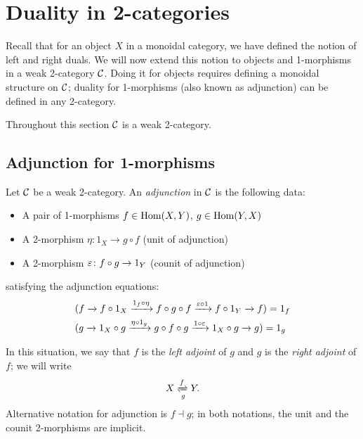 \chapter{Duality in 2-categories}\label{c:duality-2cat}

Recall that for an object $X$ in a monoidal category, we have defined the
notion of left and right duals. We will now extend this notion to objects and
1-morphisms in a weak 2-category $\mathcal{C}$. Doing it for objects requires
defining a monoidal structure on $\mathcal{C}$; duality for 1-morphisms (also known as
adjunction) can be defined in any 2-category.

Throughout this section $\mathcal{C}$ is a weak 2-category.
\section{Adjunction for 1-morphisms}\label{s:adjunction}
\begin{definition}\label{d:adjunction}
  Let $\mathcal{C}$ be a weak 2-category. An \emph{adjunction} in $\mathcal{C}$ is the
  following data:
  \begin{itemize}
    \item A pair of 1-morphisms $f\in\operatorname{Hom}(X,Y)$, $g\in \operatorname{Hom}(Y,X)$
    \item A 2-morphism $\eta\colon 1_X\to g\circ f$ (unit of adjunction)
    \item A 2-morphism $\varepsilon\colon f\circ g\to 1_Y$ (counit of adjunction)
  \end{itemize}
  satisfying the adjunction equations:
  \begin{equation}\label{e:adjunction}
    \begin{aligned}
      &(f\xrightarrow{} f \circ 1_X \xrightarrow{1_f\circ \eta}
        f\circ g\circ f \xrightarrow{\varepsilon \circ 1}
        f\circ 1_Y \xrightarrow{} f)=1_f\\
      &(g\xrightarrow{}  1_X \circ g \xrightarrow{\eta\circ 1_g}
        g\circ f\circ g \xrightarrow{1 \circ \varepsilon}
        1_X\circ g \xrightarrow{} g)=1_g
    \end{aligned}
  \end{equation}

  In this situation, we say that $f$ is the \emph{left
  adjoint} of $g$ and $g$ is the \emph{right
  adjoint} of $f$; we will write $$
  X\xrightleftharpoons[g]{f}Y. $$ Alternative notation for adjunction is
  $f\dashv g$; in both notations, the unit and the counit 2-morphisms are
  implicit.
\end{definition}

